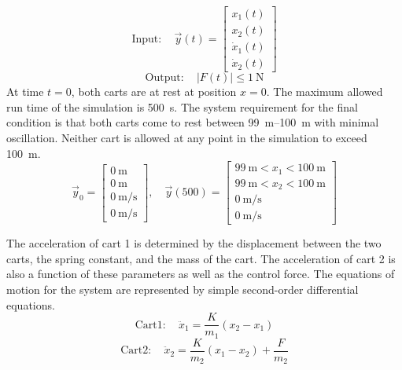 \begin{displaymath}
    \mathrm{Input:}\quad \vec{y}(t)= \begin{bmatrix} x_{1}(t)\\ x_{2}(t)\\ \dot{x}_{1}(t)\\
\dot{x}_{2}(t) \end{bmatrix}
\end{displaymath}
\begin{displaymath} \mathrm{Output:}\quad |F(t)|\le
\SI{1}{\newton}
\end{displaymath}
At time $t=0$, both carts are at rest at position
$x=0$. The maximum allowed run time of the simulation is \SI{500}{\second}. The system requirement for the
final condition is that both carts come to rest between \SIrange{99}{100}{\metre} with minimal oscillation.
Neither cart is allowed at any point in the simulation to exceed \SI{100}{\metre}.
\begin{displaymath}
    \vec{y}_0=\begin{bmatrix}
\SI{0}{\metre}\\\SI{0}{\metre}\\\SI{0}{\metre\per\second}\\\SI{0}{\metre\per\second} \end{bmatrix},\quad
\vec{y}(500)=\begin{bmatrix} \SI{99}{\metre}<x_1<\SI{100}{\metre}\\ \SI{99}{\metre}<x_2<\SI{100}{\metre}\\ \SI{0}{\metre\per\second}\\
\SI{0}{\metre\per\second} \end{bmatrix}
\end{displaymath}

The acceleration of cart 1 is determined by the displacement between the two carts, the spring constant, and
the mass of the cart. The acceleration of cart 2 is also a function of these parameters as well as the control
force. The equations of motion for the system are represented by simple second-order differential equations.
\begin{equation}
\label{e:cart1} \mathrm{Cart 1:}\quad \ddot{x}_1=\frac{K}{m_1}(x_2-x_1) 
\end{equation}
\begin{equation}
    \label{e:cart2} \mathrm{Cart 2:}\quad \ddot{x}_2=\frac{K}{m_2}(x_1-x_2)+\frac{F}{m_2}
\end{equation} 

